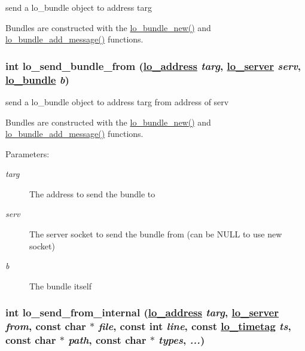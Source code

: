 send a lo\_\-bundle object to address targ 

Bundles are constructed with the \hyperlink{group__liblolowlevel_g330a4a4e6227b185b3ec6219ff3e2859}{lo\_\-bundle\_\-new()} and \hyperlink{group__liblolowlevel_g44e0e03554e91e76e5856e99fbb8afad}{lo\_\-bundle\_\-add\_\-message()} functions. \hypertarget{group__liblolowlevel_gb5de220b7d6d7c2bf6b0ca4316a54b7a}{
\subsubsection[lo\_\-send\_\-bundle\_\-from]{\setlength{\rightskip}{0pt plus 5cm}int lo\_\-send\_\-bundle\_\-from (\hyperlink{lo__types_8h_bf9b53223467de596b89e1377b0f3f3d}{lo\_\-address} {\em targ}, \hyperlink{lo__types_8h_59067bf50cf8abb4371da6f03c9036c9}{lo\_\-server} {\em serv}, \hyperlink{lo__types_8h_96254950ad34e9cfbf8a6613fc74025b}{lo\_\-bundle} {\em b})}}
\label{group__liblolowlevel_gb5de220b7d6d7c2bf6b0ca4316a54b7a}


send a lo\_\-bundle object to address targ from address of serv 

Bundles are constructed with the \hyperlink{group__liblolowlevel_g330a4a4e6227b185b3ec6219ff3e2859}{lo\_\-bundle\_\-new()} and \hyperlink{group__liblolowlevel_g44e0e03554e91e76e5856e99fbb8afad}{lo\_\-bundle\_\-add\_\-message()} functions.

\begin{Desc}
\item[Parameters:]
\begin{description}
\item[{\em targ}]The address to send the bundle to \item[{\em serv}]The server socket to send the bundle from (can be NULL to use new socket) \item[{\em b}]The bundle itself \end{description}
\end{Desc}
\hypertarget{group__liblolowlevel_gcf95994303f815825ed7053b9519ca3f}{
\subsubsection[lo\_\-send\_\-from\_\-internal]{\setlength{\rightskip}{0pt plus 5cm}int lo\_\-send\_\-from\_\-internal (\hyperlink{lo__types_8h_bf9b53223467de596b89e1377b0f3f3d}{lo\_\-address} {\em targ}, \hyperlink{lo__types_8h_59067bf50cf8abb4371da6f03c9036c9}{lo\_\-server} {\em from}, const char $\ast$ {\em file}, const int {\em line}, const \hyperlink{structlo__timetag}{lo\_\-timetag} {\em ts}, const char $\ast$ {\em path}, const char $\ast$ {\em types},  {\em ...})}}
\label{group__liblolowlevel_gcf95994303f815825ed7053b9519ca3f}


